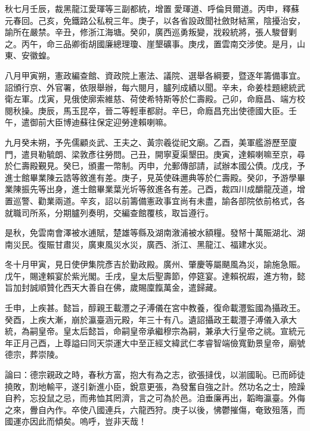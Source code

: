 \begin{pinyinscope}
秋七月壬辰，裁黑龍江愛琿等三副都統，增置愛琿道、呼倫貝爾道。丙申，釋蘇元春回。己亥，免鐵路公私稅三年。庚子，以各省設政聞社斂財結黨，陰擾治安，諭所在嚴禁。辛丑，修浙江海塘。癸卯，廣西巡勇叛變，戕殺統將，張人駿督剿之。丙午，命三品卿銜胡國廉總理瓊、崖墾礦事。庚戌，置雲南交涉使。是月，山東、安徽蝗。

八月甲寅朔，憲政編查館、資政院上憲法、議院、選舉各綱要，暨逐年籌備事宜。詔頒行京、外官署，依限舉辦，每六閱月，臚列成績以聞。辛未，命姜桂題總統武衛左軍。戊寅，見俄使廓索維慈、荷使希特斯等於仁壽殿。己卯，命廕昌、端方校閱秋操。庚辰，馬玉昆卒，晉二等輕車都尉。辛巳，命廕昌充出使德國大臣。壬午，遣御前大臣博迪蘇往保定迎勞達賴喇嘛。

九月癸未朔，予先儒顧炎武、王夫之、黃宗羲從祀文廟。乙酉，美軍艦游歷至廈門，遣貝勒毓朗、梁敦彥往勞問。己丑，開寧夏渠墾田。庚寅，達賴喇嘛至京，尋於仁壽殿覲見。癸巳，頒畫一幣制。丙申，允郵傳部請，試辦本國公債。戊戌，予進士館畢業陳云誥等敘進有差。庚子，見英使硃邇典等於仁壽殿。癸卯，予游學畢業陳振先等出身，進士館畢業葉光圻等敘進各有差。己酉，裁四川成釂龍茂道，增置巡警、勸業兩道。辛亥，詔以前籌備憲政事宜尚有未盡，諭各部院依前格式，各就職司所系，分期臚列奏明，交編查館覆核，取旨遵行。

是秋，免雲南會澤被水逋賦，楚雄等縣及湖南漵浦被水額糧。發帑十萬賑湖北、湖南災民。復賑甘肅災，廣東風災水災，廣西、浙江、黑龍江、福建水災。

冬十月甲寅，見日使伊集院彥吉於勤政殿。廣州、肇慶等屬颶風為災，諭施急賑。戊午，賜達賴宴於紫光閣。壬戌，皇太后聖壽節，停筵宴。達賴祝嘏，進方物，懿旨加封誠順贊化西天大善自在佛，歲賜廩餼萬金，遣歸藏。

壬申，上疾甚。懿旨，醇親王載灃之子溥儀在宮中教養，復命載灃監國為攝政王。癸酉，上疾大漸，崩於瀛臺涵元殿，年三十有八。遺詔攝政王載灃子溥儀入承大統，為嗣皇帝。皇太后懿旨，命嗣皇帝承繼穆宗為嗣，兼承大行皇帝之祧。宣統元年正月己酉，上尊謚曰同天崇運大中至正經文緯武仁孝睿智端儉寬勤景皇帝，廟號德宗，葬崇陵。

論曰：德宗親政之時，春秋方富，抱大有為之志，欲張撻伐，以湔國恥。已而師徒撓敗，割地輸平，遂引新進小臣，銳意更張，為發奮自強之計。然功名之士，險躁自矜，忘投鼠之忌，而弗恤其罔濟，言之可為於邑。洎垂廉再出，韜晦瀛臺。外侮之來，釁自內作。卒使八國連兵，六龍西狩。庚子以後，怫鬱摧傷，奄致殂落，而國運亦因此而傾矣。嗚呼，豈非天哉！


\end{pinyinscope}